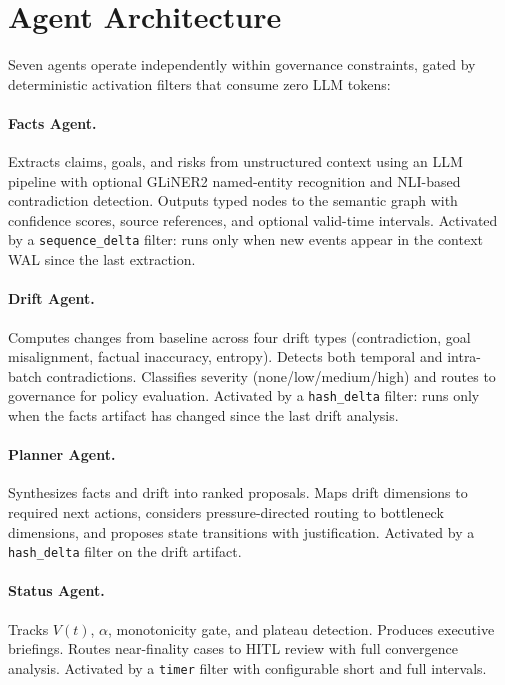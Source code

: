 \documentclass[11pt]{article}
\begin{document}
\section{Agent Architecture}

Seven agents operate independently within governance constraints, gated by deterministic activation filters that consume zero LLM tokens:

\paragraph{Facts Agent.}
Extracts claims, goals, and risks from unstructured context using an LLM pipeline with optional GLiNER2 named-entity recognition and NLI-based contradiction detection. Outputs typed nodes to the semantic graph with confidence scores, source references, and optional valid-time intervals. Activated by a \texttt{sequence\_delta} filter: runs only when new events appear in the context WAL since the last extraction.

\paragraph{Drift Agent.}
Computes changes from baseline across four drift types (contradiction, goal misalignment, factual inaccuracy, entropy). Detects both temporal and intra-batch contradictions. Classifies severity (none/low/medium/high) and routes to governance for policy evaluation. Activated by a \texttt{hash\_delta} filter: runs only when the facts artifact has changed since the last drift analysis.

\paragraph{Planner Agent.}
Synthesizes facts and drift into ranked proposals. Maps drift dimensions to required next actions, considers pressure-directed routing to bottleneck dimensions, and proposes state transitions with justification. Activated by a \texttt{hash\_delta} filter on the drift artifact.

\paragraph{Status Agent.}
Tracks $V(t)$, $\alpha$, monotonicity gate, and plateau detection. Produces executive briefings. Routes near-finality cases to HITL review with full convergence analysis. Activated by a \texttt{timer} filter with configurable short and full intervals.
\end{document}
